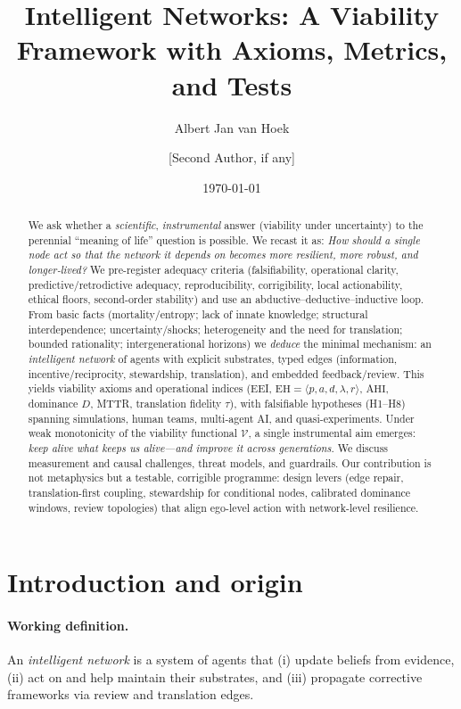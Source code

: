 \documentclass[12pt]{article}
\title{Intelligent Networks: A Viability Framework with Axioms, Metrics, and Tests}
\author{Albert Jan van Hoek \and [Second Author, if any]}
\date{\today}
\newcommand{\EH}{\ensuremath{\mathrm{EH}}}
\newcommand{\AHI}{\ensuremath{\mathrm{AHI}}}
\begin{document}
\renewcommand{\arraystretch}{1.2}
\setlength{\tabcolsep}{6pt}
\maketitle

\begin{abstract}
We ask whether a \emph{scientific}, \emph{instrumental} answer (viability under uncertainty) to the perennial
“meaning of life” question is possible. We recast it as: \emph{How should a single node act so that the network it depends on becomes more resilient, more robust, and longer‑lived?}
We pre-register adequacy criteria (falsifiability, operational clarity, predictive/retrodictive adequacy, reproducibility, corrigibility, local actionability, ethical floors, second-order stability) and use an abductive–deductive–inductive loop. From basic facts (mortality/entropy; lack of innate knowledge; structural interdependence; uncertainty/shocks; heterogeneity and the need for translation; bounded rationality; intergenerational horizons) we \emph{deduce} the minimal mechanism: an \emph{intelligent network} of agents with explicit substrates, typed edges (information, incentive/reciprocity, stewardship, translation), and embedded feedback/review. This yields viability axioms and operational indices (EEI, $\EH=\langle p,a,d,\lambda,r\rangle$, \AHI, dominance $D$, MTTR, translation fidelity $\tau$), with falsifiable hypotheses (H1–H8) spanning simulations, human teams, multi-agent AI, and quasi-experiments. Under weak monotonicity of the viability functional $\mathcal V$, a single instrumental aim emerges: \emph{keep alive what keeps us alive—and improve it across generations}. We discuss measurement and causal challenges, threat models, and guardrails. Our contribution is not metaphysics but a testable, corrigible programme: design levers (edge repair, translation-first coupling, stewardship for conditional nodes, calibrated dominance windows, review topologies) that align ego-level action with network-level resilience.
\end{abstract}

\section{Introduction and origin}

\paragraph{Working definition.}
An \emph{intelligent network} is a system of agents that (i) update beliefs from evidence, (ii) act on and help maintain their substrates, and (iii) propagate corrective frameworks via review and translation edges.
\end{document}
